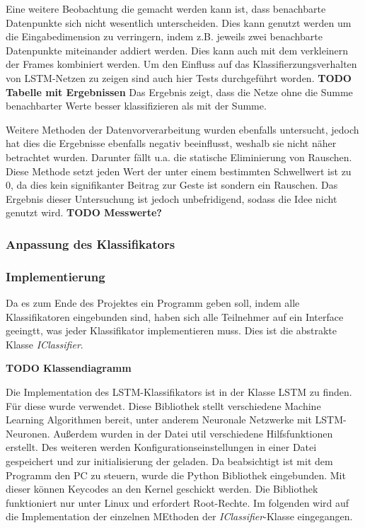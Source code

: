 Eine weitere Beobachtung die gemacht werden kann ist, dass benachbarte
Datenpunkte sich nicht wesentlich unterscheiden. Dies kann genutzt werden um die
Eingabedimension zu verringern, indem z.B. jeweils zwei benachbarte Datenpunkte
miteinander addiert werden. Dies kann auch mit dem verkleinern der Frames
kombiniert werden. Um den Einfluss auf das Klassifierzungsverhalten von
\ac{LSTM}-Netzen zu zeigen sind auch hier Tests durchgeführt worden.
\textbf{TODO Tabelle mit Ergebnissen} Das Ergebnis zeigt, dass die Netze ohne
die Summe benachbarter Werte besser klassifizieren als mit der Summe. 

Weitere Methoden der Datenvorverarbeitung wurden ebenfalls untersucht, jedoch
hat dies die Ergebnisse ebenfalls negativ beeinflusst, weshalb sie nicht näher
betrachtet wurden. Darunter fällt u.a. die statische Eliminierung von Rauschen.
Diese Methode setzt jeden Wert der unter einem bestimmten Schwellwert ist zu 0,
da dies kein signifikanter Beitrag zur Geste ist sondern ein Rauschen. Das
Ergebnis dieser Untersuchung ist jedoch unbefridigend, sodass die Idee nicht
genutzt wird. \textbf{TODO Messwerte?}
 


\subsubsection{Anpassung des Klassifikators}
\subsubsection{Implementierung}
Da es zum Ende des Projektes ein Programm geben soll, indem alle Klassifikatoren 
eingebunden sind, haben sich alle Teilnehmer auf ein Interface geeingtt, was 
jeder Klassifikator implementieren muss. Dies ist die abstrakte Klasse \textit{IClassifier}.

\textbf{TODO Klassendiagramm}

Die Implementation des \ac{LSTM}-Klassifikators ist in der Klasse LSTM zu finden.
Für diese wurde \cite{PyBrain} verwendet. Diese Bibliothek stellt verschiedene
Machine Learning Algorithmen bereit, unter anderem Neuronale Netzwerke mit 
\ac{LSTM}-Neuronen.
Außerdem wurden in der Datei util verschiedene Hilfsfunktionen erstellt.
Des weiteren werden Konfigurationseinstellungen in einer Datei gespeichert und zur 
initialisierung der geladen. 
Da beabsichtigt ist mit dem Programm den PC zu steuern, wurde die Python Bibliothek 
\cite{Python-uinput} eingebunden. Mit dieser können Keycodes an den Kernel geschickt werden.
Die Bibliothek funktioniert nur unter Linux und erfordert Root-Rechte.
Im folgenden wird auf die Implementation der einzelnen MEthoden der 
\textit{IClassifier}-Klasse eingegangen.

